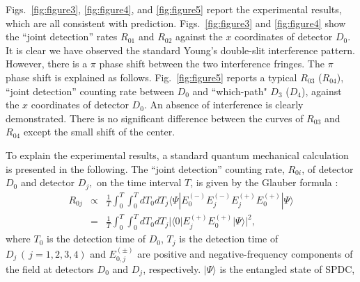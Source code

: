 \documentclass[pra,aps,epsf,12pt]{revtex4-2}
\begin{document}
Figs.~\ref{fig:figure3}, \ref{fig:figure4}, and \ref{fig:figure5} report the experimental
results, which are all consistent with prediction. Figs.~\ref{fig:figure3} and
\ref{fig:figure4} show the ``joint detection'' rates $R_{01}$ and $R_{02}$ against the
$x$ coordinates of detector $D_{0}$. It is clear we have observed the standard Young's
double-slit interference pattern. However, there is a $\pi $ phase shift between the two
interference fringes. The $\pi$ phase shift
is explained as follows. Fig.~\ref{fig:figure5} reports a typical $%
R_{03}$ ($R_{04}$), ``joint detection'' counting rate between $D_{0}$ and ``which-path" $%
D_{3}$ ($D_{4}$), against the $x$ coordinates of detector $D_{0}$. An absence of
interference is clearly demonstrated. There is no significant difference between the
curves of $R_{03}$ and $R_{04}$ except the small shift of the center.

To explain the experimental results, a standard quantum mechanical calculation is
presented in the following. The ``joint detection'' counting rate, $R_{0i}$, of detector
$D_{0}$ and detector $D_{j},$ on the time interval $T$, is given by the Glauber formula
\cite{Glauber}:
\begin{eqnarray}
R_{0j}&\propto& \frac{1}{T}\int_{0}^{T}\int_{0}^{T}dT_{0}dT_{j}\langle \Psi |
E_{0}^{(-)}E_{j}^{(-)}E_{j}^{(+)}E_{0}^{(+)}| \Psi \rangle \nonumber \\
&=&\frac{1}{T}\int_{0}^{T}\int_{0}^{T}dT_{0}dT_{j}| \langle 0| E_{j}^{(+)}E_{0}^{(+)}|
\Psi \rangle | ^{2} , \label{coin}
\end{eqnarray}
where $T_{0}$ is the detection time of $D_{0}$, $T_{j}$ is the detection time of $D_{j}\,(
\,j=1,2,3,4)$ and $E_{0,j}^{(\pm )}$ are positive and negative-frequency components of the
field at detectors $D_{0}$ and $D_{j}$, respectively. $| \Psi \rangle$ is the entangled
state of SPDC,
\end{document}
